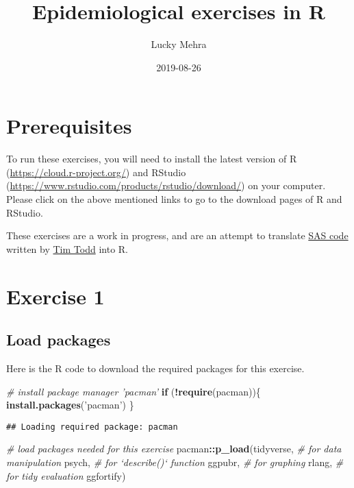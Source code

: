 \documentclass[]{book}
\title{Epidemiological exercises in R}
\author{Lucky Mehra}
\date{2019-08-26}
\newenvironment{Shaded}{\begin{snugshade}}{\end{snugshade}}
\newcommand{\CommentTok}[1]{\textcolor[rgb]{0.56,0.35,0.01}{\textit{#1}}}
\newcommand{\ControlFlowTok}[1]{\textcolor[rgb]{0.13,0.29,0.53}{\textbf{#1}}}
\newcommand{\KeywordTok}[1]{\textcolor[rgb]{0.13,0.29,0.53}{\textbf{#1}}}
\newcommand{\NormalTok}[1]{#1}
\newcommand{\OperatorTok}[1]{\textcolor[rgb]{0.81,0.36,0.00}{\textbf{#1}}}
\newcommand{\StringTok}[1]{\textcolor[rgb]{0.31,0.60,0.02}{#1}}
\begin{document}
\maketitle

{
\setcounter{tocdepth}{1}
\tableofcontents
}
\hypertarget{prerequisites}{%
\chapter*{Prerequisites}\label{prerequisites}}

To run these exercises, you will need to install the latest version of R (\url{https://cloud.r-project.org/}) and RStudio (\url{https://www.rstudio.com/products/rstudio/download/}) on your computer. Please click on the above mentioned links to go to the download pages of R and RStudio.

These exercises are a work in progress, and are an attempt to translate \protect\hyperlink{sascode}{SAS code} written by \href{https://www.plantpath.k-state.edu/people/faculty/todd-timothy/}{Tim Todd} into R.

\hypertarget{ex1}{%
\chapter{Exercise 1}\label{ex1}}

\hypertarget{load-packages}{%
\section{Load packages}\label{load-packages}}

Here is the R code to download the required packages for this exercise.

\begin{Shaded}
\begin{Highlighting}[]
\CommentTok{# install package manager 'pacman'}
\ControlFlowTok{if}\NormalTok{ (}\OperatorTok{!}\KeywordTok{require}\NormalTok{(pacman))\{}
  \KeywordTok{install.packages}\NormalTok{(}\StringTok{'pacman'}\NormalTok{)}
\NormalTok{\}}
\end{Highlighting}
\end{Shaded}

\begin{verbatim}
## Loading required package: pacman
\end{verbatim}

\begin{Shaded}
\begin{Highlighting}[]
\CommentTok{# load packages needed for this exercise}
\NormalTok{pacman}\OperatorTok{::}\KeywordTok{p_load}\NormalTok{(tidyverse, }\CommentTok{# for data manipulation}
\NormalTok{                             psych, }\CommentTok{# for `describe()` function}
\NormalTok{                             ggpubr, }\CommentTok{# for graphing}
\NormalTok{                             rlang, }\CommentTok{# for tidy evaluation}
\NormalTok{                             ggfortify)}
\end{Highlighting}
\end{Shaded}
\end{document}
